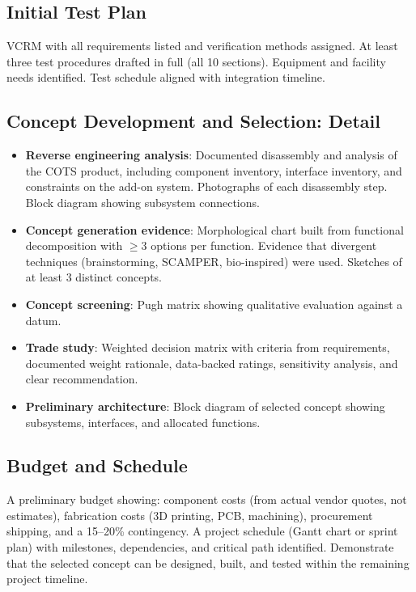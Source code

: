 \documentclass[11pt,letterpaper,twoside,openany]{book}
\begin{document}
\subsection{Initial Test Plan}
VCRM with all requirements listed and verification methods assigned. At least three test procedures drafted in full (all 10 sections). Equipment and facility needs identified. Test schedule aligned with integration timeline.



\subsection{Concept Development and Selection: Detail}
\begin{itemize}[leftmargin=1.5em]
\item \textbf{Reverse engineering analysis}: Documented disassembly and analysis of the COTS product, including component inventory, interface inventory, and constraints on the add-on system. Photographs of each disassembly step. Block diagram showing subsystem connections.
\item \textbf{Concept generation evidence}: Morphological chart built from functional decomposition with $\geq$3 options per function. Evidence that divergent techniques (brainstorming, SCAMPER, bio-inspired) were used. Sketches of at least 3 distinct concepts.
\item \textbf{Concept screening}: Pugh matrix showing qualitative evaluation against a datum.
\item \textbf{Trade study}: Weighted decision matrix with criteria from requirements, documented weight rationale, data-backed ratings, sensitivity analysis, and clear recommendation.
\item \textbf{Preliminary architecture}: Block diagram of selected concept showing subsystems, interfaces, and allocated functions.
\end{itemize}

\subsection{Budget and Schedule}
A preliminary budget showing: component costs (from actual vendor quotes, not estimates), fabrication costs (3D printing, PCB, machining), procurement shipping, and a 15--20\% contingency. A project schedule (Gantt chart or sprint plan) with milestones, dependencies, and critical path identified. Demonstrate that the selected concept can be designed, built, and tested within the remaining project timeline.
\end{document}
